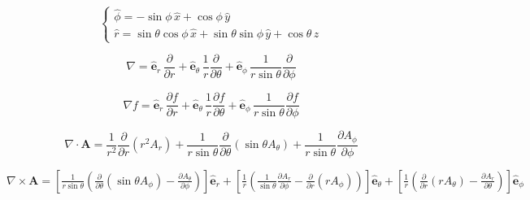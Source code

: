 \begin{enumerate}
\[\begin{cases}
\hat{\phi} =
-\sin\phi\,\hat{x}+
\cos\phi\,\hat{y}\\[6pt]

\hat{r} =
\sin\theta\cos\phi\,\hat{x}+
\sin\theta\sin\phi\,\hat{y}+
\cos\theta\,\hat{z}
\end{cases}
\]

\[
\nabla
=
\hat{\mathbf e}_r\,\frac{\partial}{\partial r}
+\hat{\mathbf e}_\theta\,\frac{1}{r}\frac{\partial}{\partial \theta}
+\hat{\mathbf e}_\phi\,\frac{1}{r\sin\theta}\frac{\partial}{\partial \phi}
\]

\[
\nabla f
=
\hat{\mathbf e}_r\,\frac{\partial f}{\partial r}
+\hat{\mathbf e}_\theta\,\frac{1}{r}\frac{\partial f}{\partial \theta}
+\hat{\mathbf e}_\phi\,\frac{1}{r\sin\theta}\frac{\partial f}{\partial \phi}
\]

\[
\nabla\cdot \mathbf A
=
\frac{1}{r^2}\frac{\partial}{\partial r}\left(r^2 A_r\right)
+\frac{1}{r\sin\theta}\frac{\partial}{\partial \theta}\left(\sin\theta A_\theta\right)
+\frac{1}{r\sin\theta}\frac{\partial A_\phi}{\partial \phi}
\]

$
\nabla\times \mathbf A
=
\left[
\frac{1}{r\sin\theta}
\left(
\frac{\partial}{\partial \theta}(\sin\theta A_\phi)
-
\frac{\partial A_\theta}{\partial \phi}
\right)
\right]\hat{\mathbf e}_r
+
\left[
\frac{1}{r}
\left(
\frac{1}{\sin\theta}\frac{\partial A_r}{\partial \phi}
-
\frac{\partial}{\partial r}(rA_\phi)
\right)
\right]\hat{\mathbf e}_\theta
+
\left[
\frac{1}{r}
\left(
\frac{\partial}{\partial r}(rA_\theta)
-
\frac{\partial A_r}{\partial \theta}
\right)
\right]\hat{\mathbf e}_\phi
$
\end{enumerate}

